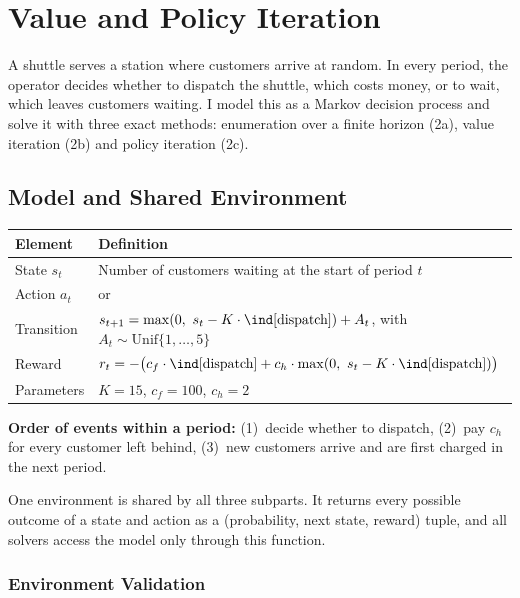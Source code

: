 \section{Value and Policy Iteration}
\label{sec:dp}

A shuttle serves a station where customers arrive at random. In every period, the operator decides whether to dispatch the shuttle, which costs money, or to wait, which leaves customers waiting. I model this as a Markov decision process and solve it with three exact methods: enumeration over a finite horizon (2a), value iteration (2b) and policy iteration (2c).

\subsection{Model and Shared Environment}

\begin{center}
\begin{tabularx}{\textwidth}{@{}lL@{}}
  \toprule
  \textbf{Element} & \textbf{Definition} \\
  \midrule
  State $s_t$ & Number of customers waiting at the start of period $t$ \\
  Action $a_t$ &  or  \\
  Transition & $s_{t+1} = \max(0,\ s_t - K \cdot \ind[\text{dispatch}]) + A_t$, with $A_t \sim \text{Unif}\{1, \dots, 5\}$ \\
  Reward & $r_t = -\big(c_f \cdot \ind[\text{dispatch}] + c_h \cdot \max(0,\ s_t - K \cdot \ind[\text{dispatch}])\big)$ \\
  Parameters & $K = 15$, $c_f = 100$, $c_h = 2$ \\
  \bottomrule
\end{tabularx}
\end{center}

\textbf{Order of events within a period:} (1)~decide whether to dispatch, (2)~pay $c_h$ for every customer left behind, (3)~new customers arrive and are first charged in the next period.

One environment is shared by all three subparts. It returns every possible outcome of a state and action as a (probability, next state, reward) tuple, and all solvers access the model only through this function.

\subsubsection{Environment Validation}

